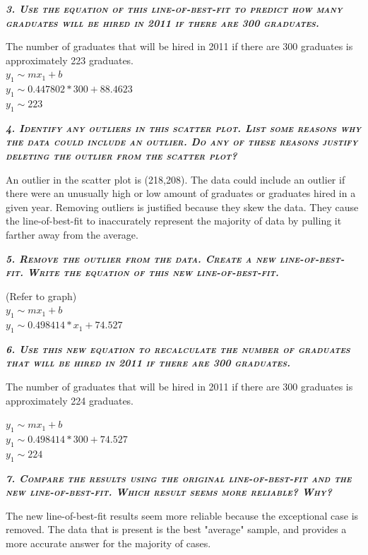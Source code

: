 \documentclass{article}
\begin{document}
\textbf{\emph{\textsc{3. Use the equation of this line-of-best-fit to predict how many graduates will be hired in 2011 if there are 300 graduates.}}}

The number of graduates that will be hired in 2011 if there are 300 graduates is approximately 223 graduates. \\
$y_{1}\mathtt{\sim}mx_{1}+b$ \\
$y_{1}\mathtt{\sim}0.447802*300+88.4623$ \\
$y_{1}\mathtt{\sim}223$

\textbf{\emph{\textsc{4. Identify any outliers in this scatter plot. List some reasons why the data could include an outlier. Do any of these reasons justify deleting the outlier from the scatter plot?}}}

An outlier in the scatter plot is (218,208). The data could include an outlier if there were an unusually high or low amount of graduates or graduates hired in a given year. Removing outliers is justified because they skew the data. They cause the line-of-best-fit to inaccurately represent the majority of data by pulling it farther away from the average.

\textbf{\emph{\textsc{5. Remove the outlier from the data. Create a new line-of-best-fit. Write the equation of this new line-of-best-fit.}}}

(Refer to graph) \\
$y_{1}\mathtt{\sim}mx_{1}+b$ \\ 
$y_{1}\mathtt{\sim}0.498414*x_{1}+74.527$

\textbf{\emph{\textsc{6. Use this new equation to recalculate the number of graduates that will be hired in 2011 if there are 300 graduates.}}}

The number of graduates that will be hired in 2011 if there are 300 graduates is approximately 224 graduates.

$y_{1}\mathtt{\sim}mx_{1}+b$ \\ 
$y_{1}\mathtt{\sim}0.498414*300+74.527$ \\
$y_{1}\mathtt{\sim}224$

\textbf{\emph{\textsc{7. Compare the results using the original line-of-best-fit and the new line-of-best-fit. Which result seems more reliable? Why?}}}

The new line-of-best-fit results seem more reliable because the exceptional case is removed. The data that is present is the best "average" sample, and provides a more accurate answer for the majority of cases.
\end{document}
